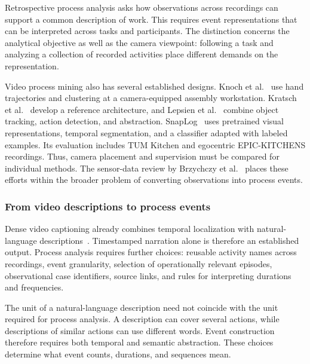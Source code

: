 Retrospective process analysis asks how observations across recordings can support a common description of work. This requires event representations that can be interpreted across tasks and participants. The distinction concerns the analytical objective as well as the camera viewpoint: following a task and analyzing a collection of recorded activities place different demands on the representation.

Video process mining also has several established designs. Knoch et al.~\cite{knoch2020video} use hand trajectories and clustering at a camera-equipped assembly workstation. Kratsch et al.~\cite{kratsch2022video} develop a reference architecture, and Lepsien et al.~\cite{lepsien2023analytics} combine object tracking, action detection, and abstraction. SnapLog~\cite{pegoraro2026snaplog} uses pretrained visual representations, temporal segmentation, and a classifier adapted with labeled examples. Its evaluation includes TUM Kitchen and egocentric EPIC-KITCHENS recordings. Thus, camera placement and supervision must be compared for individual methods. The sensor-data review by Brzychczy et al.~\cite{brzychczy2025sensor} places these efforts within the broader problem of converting observations into process events.

\subsubsection{From video descriptions to process events}
Dense video captioning already combines temporal localization with natural-language descriptions~\cite{krishna2017densecaptioning}. Timestamped narration alone is therefore an established output. Process analysis requires further choices: reusable activity names across recordings, event granularity, selection of operationally relevant episodes, observational case identifiers, source links, and rules for interpreting durations and frequencies.

The unit of a natural-language description need not coincide with the unit required for process analysis. A description can cover several actions, while descriptions of similar actions can use different words. Event construction therefore requires both temporal and semantic abstraction. These choices determine what event counts, durations, and sequences mean.

